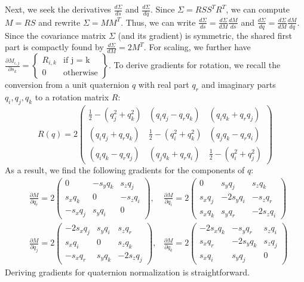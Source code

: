 \begin{appendix}
	Next, we seek the derivatives $\frac{d\Sigma}{ds}$ and $\frac{d\Sigma}{dq}$. Since $\Sigma = RSS^TR^T$, we can compute $M = RS$ and rewrite $\Sigma = MM^T$. Thus, we can write $\frac{d\Sigma}{ds} = \frac{d\Sigma}{dM} \frac{dM}{ds}$ and $\frac{d\Sigma}{dq} = \frac{d\Sigma}{dM} \frac{dM}{dq}$. Since the covariance matrix $\Sigma$ (and its gradient) is symmetric, the shared first part is compactly found by $\frac{d\Sigma}{dM} = 2M^T$. For scaling, we further have
	$	\frac{\partial M_{i,j}}{\partial s_k} =  \left\{\begin{array}{lr}
		R_{i,k} & \text{if j = k}\\
		0 & \text{otherwise}
	\end{array}\right\}$.
	To derive gradients for rotation, we recall the conversion from a unit quaternion $q$ with real part $q_r$ and imaginary parts $q_i, q_j, q_k$ to a rotation matrix $R$:
	\begin{equation}
		R(q) = 2\begin{pmatrix}
			\frac{1}{2} - (q_j^2 + q_k^2) & (q_i q_j - q_r q_k) & (q_i q_k + q_r q_j)\\
			(q_i q_j + q_r q_k) & \frac{1}{2} - (q_i^2 + q_k^2) & (q_j q_k - q_r q_i)\\
			(q_i q_k - q_r q_j) & (q_j q_k + q_r q_i) & \frac{1}{2} - (q_i^2 + q_j^2)
		\end{pmatrix}
		\label{eq:quat}
	\end{equation}
	As a result, we find the following gradients for the components of $q$:
	\begin{equation}
		\begin{aligned}
			&\frac{\partial M}{\partial q_r} = 2 \left(\begin{smallmatrix}
				0 & -s_y q_k & s_z q_j\\
				s_x q_k & 0 & -s_z q_i\\
				-s_x q_j & s_y q_i & 0
			\end{smallmatrix}\right),
			&\frac{\partial M}{\partial q_i} = 2\left(\begin{smallmatrix}
				0 & s_y q_j & s_z q_k\\
				s_x q_j & -2 s_y q_i & -s_z q_r\\
				s_x q_k & s_y q_r & -2 s_z q_i
			\end{smallmatrix}\right)
			\\
			&\frac{\partial M}{\partial q_j} = 2\left(\begin{smallmatrix}
				-2 s_x q_j & s_y q_i & s_z q_r\\
				s_x q_i & 0 & s_z q_k\\
				-s_x q_r & s_y q_k & -2s_z q_j
			\end{smallmatrix}\right),
			&\frac{\partial M}{\partial q_k} = 2\left(\begin{smallmatrix}
				-2 s_x q_k & -s_y q_r & s_z q_i\\
				s_x q_r & -2s_y q_k & s_z q_j\\
				s_x q_i & s_y q_j & 0
			\end{smallmatrix}\right)
		\end{aligned}
	\end{equation}
Deriving gradients for quaternion normalization is straightforward.


\end{appendix}
